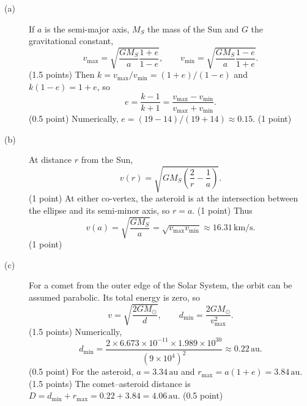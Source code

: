 \begin{description}
\item[(a)] If $a$ is the semi-major axis, $M_S$ the mass of the Sun and $G$ the gravitational constant,
\[
v_{\max}=\sqrt{\frac{GM_S}{a}\frac{1+e}{1-e}},\qquad
v_{\min}=\sqrt{\frac{GM_S}{a}\frac{1-e}{1+e}}.
\]\hfill(1.5 points)
Then $k=v_{\max}/v_{\min}=(1+e)/(1-e)$ and $k(1-e)=1+e$, so
\[
e=\frac{k-1}{k+1}=\frac{v_{\max}-v_{\min}}{v_{\max}+v_{\min}}.
\]\hfill(0.5 point)
Numerically, $e=(19-14)/(19+14)\approx0.15$. \hfill(1 point)
\item[(b)] At distance $r$ from the Sun,
\[
v(r)=\sqrt{GM_S\left(\frac2r-\frac1a\right)}.
\]\hfill(1 point)
At either co-vertex, the asteroid is at the intersection between the ellipse and its semi-minor axis, so $r=a$. \hfill(1 point)
Thus
\[
v(a)=\sqrt{\frac{GM_S}{a}}=\sqrt{v_{\max}v_{\min}}\approx16.31\,\mathrm{km/s}.
\]\hfill(1 point)
\item[(c)] For a comet from the outer edge of the Solar System, the orbit can be assumed parabolic. Its total energy is zero, so
\[
v=\sqrt{\frac{2GM_\odot}{d}},\qquad d_{\min}=\frac{2GM_\odot}{v_{\max}^2}.
\]\hfill(1.5 points)
Numerically,
\[
d_{\min}=\frac{2\times6.673\times10^{-11}\times1.989\times10^{30}}{(9\times10^4)^2}\approx0.22\,\mathrm{au}.
\]\hfill(0.5 point)
For the asteroid, $a=3.34\,\mathrm{au}$ and $r_{\max}=a(1+e)=3.84\,\mathrm{au}$. \hfill(1.5 points)
The comet--asteroid distance is $D=d_{\min}+r_{\max}=0.22+3.84=4.06\,\mathrm{au}$. \hfill(0.5 point)
\end{description}
